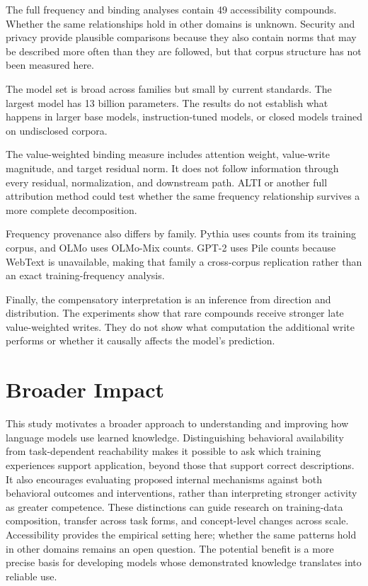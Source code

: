 \documentclass[
  english,
]{article}
\begin{document}
The full frequency and binding analyses contain 49 accessibility compounds. Whether the same relationships hold in other domains is unknown. Security and privacy provide plausible comparisons because they also contain norms that may be described more often than they are followed, but that corpus structure has not been measured here.

The model set is broad across families but small by current standards. The largest model has 13 billion parameters. The results do not establish what happens in larger base models, instruction-tuned models, or closed models trained on undisclosed corpora.

The value-weighted binding measure includes attention weight, value-write magnitude, and target residual norm. It does not follow information through every residual, normalization, and downstream path. ALTI or another full attribution method could test whether the same frequency relationship survives a more complete decomposition.

Frequency provenance also differs by family. Pythia uses counts from its training corpus, and OLMo uses OLMo-Mix counts. GPT-2 uses Pile counts because WebText is unavailable, making that family a cross-corpus replication rather than an exact training-frequency analysis.

Finally, the compensatory interpretation is an inference from direction and distribution. The experiments show that rare compounds receive stronger late value-weighted writes. They do not show what computation the additional write performs or whether it causally affects the model's prediction.

\section{Broader Impact}\label{broader-impact}

This study motivates a broader approach to understanding and improving how language models use learned knowledge. Distinguishing behavioral availability from task-dependent reachability makes it possible to ask which training experiences support application, beyond those that support correct descriptions. It also encourages evaluating proposed internal mechanisms against both behavioral outcomes and interventions, rather than interpreting stronger activity as greater competence. These distinctions can guide research on training-data composition, transfer across task forms, and concept-level changes across scale. Accessibility provides the empirical setting here; whether the same patterns hold in other domains remains an open question. The potential benefit is a more precise basis for developing models whose demonstrated knowledge translates into reliable use.
\end{document}
